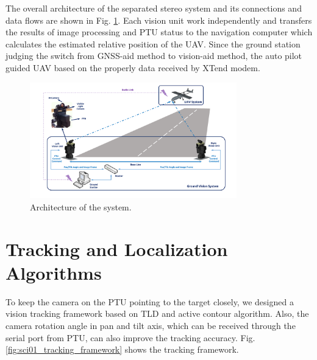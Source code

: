 The overall architecture of the separated stereo system and its connections and data flows are shown in Fig. \ref{fig:SystemStructure}. Each vision unit work independently and transfers the results of image processing and PTU status to the navigation computer which calculates the estimated relative position of the UAV. Since the ground station judging the switch from GNSS-aid method to vision-aid method, the auto pilot guided UAV based on the properly data received by XTend modem. 

\begin{figure}[!tb]
	\centering
	\includegraphics[width=0.8\textwidth]{Figs/SystemStructure2.pdf}
	\caption{Architecture of the system.}
	\label{fig:SystemStructure}
\end{figure}




\section{Tracking and Localization Algorithms}
To keep the camera on the PTU pointing to the target closely, we designed a   vision tracking framework based on TLD and active contour algorithm. Also, the camera rotation angle in pan and tilt axis, which can be received through the serial port from PTU, can also improve the tracking accuracy. Fig. \ref{fig:sci01_tracking_framework} shows the tracking framework.

